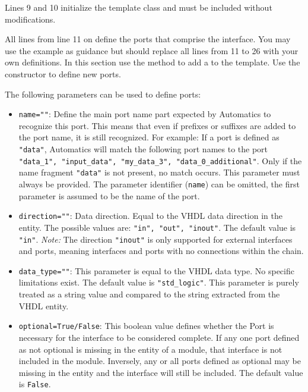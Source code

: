 Lines 9 and 10 initialize the template class and must be included without modifications.

All lines from line 11 on define the ports that comprise the interface.
You may use the example as guidance but should replace all lines from 11 to 26 with your own definitions.
In this section use the method  to add a  to the template.
Use the constructor  to define new ports.

The following parameters can be used to define ports:

\begin{itemize}
\item \texttt{name=""}:
Define the main port name part expected by Automatics to recognize this port.
This means that even if prefixes or suffixes are added to the port name, it is still recognized.
For example: If a port is defined as \texttt{"data"}, Automatics will match the following port names to the port \texttt{"data\_1", "input\_data", "my\_data\_3", "data\_0\_additional"}.
Only if the name fragment \texttt{"data"} is not present, no match occurs.
This parameter must always be provided.
The parameter identifier (\texttt{name}) can be omitted, the first parameter is assumed to be the name of the port.

\item \texttt{direction=""}:
Data direction.
Equal to the VHDL data direction in the entity.
The possible values are: \texttt{"in", "out", "inout"}.
The default value is \texttt{"in"}.
\textit{Note:} The direction \texttt{"inout"} is only supported for external interfaces and ports, meaning interfaces and ports with no connections within the \asterics chain.

\item \texttt{data\_type=""}:
This parameter is equal to the VHDL data type.
No specific limitations exist.
The default value is \texttt{"std\_logic"}.
This parameter is purely treated as a string value and compared to the string extracted from the VHDL entity.

\item \texttt{optional=True/False}:
This boolean value defines whether the Port is necessary for the interface to be considered complete.
If any one port defined as not optional is missing in the entity of a module, that interface is not included in the module.
Inversely, any or all ports defined as optional may be missing in the entity and the interface will still be included.
The default value is \texttt{False}.
\end{itemize}

